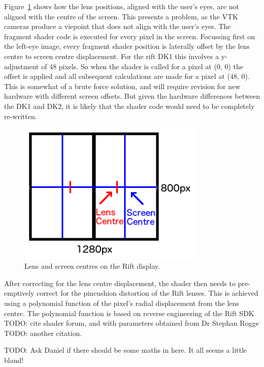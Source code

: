 \documentclass[MSc,paper=a4,pagesize=auto]{icldt}
\begin{document}
Figure~\ref{fig:rift_screen} shows how the lens positions, aligned with the user's eyes, are not aligned with the centre of the screen. This presents a problem, as the VTK cameras produce a viepoint that does not align with the user's eyes. The fragment shader code is executed for every pixel in the screen. Focussing first on the left-eye image, every fragment shader position is laterally offset by the lens centre to screen centre displacement. For the rift DK1 this involves a y-adjustment of 48 pixels. So when the shader is called for a pixel at (0, 0) the offset is applied and all subsequent calculations are made for a pixel at (48, 0). This is somewhat of a brute force solution, and will require revision for new hardware with different screen offsets. But given the hardware differences between the DK1 and DK2, it is likely that the shader code would need to be completely re-written.

\begin{figure}[htbp!]
    \centering
    \includegraphics[width=0.8\textwidth]{resources/rift_screen}
    \caption{Lens and screen centres on the Rift display.}
    \label{fig:rift_screen}
\end{figure}

After correcting for the lens centre displacement, the shader then needs to pre-emptively correct for the pincushion distortion of the Rift lenses. This is achieved using a polynomial function of the pixel's radial displacement from the lens centre. The polynomial function is based on reverse engineering of the Rift SDK TODO: cite shader forum, and with parameters obtained from Dr Stephan Rogge TODO: another citation. 

TODO: Ask Daniel if there should be some maths in here. It all seems a little bland!
\end{document}
